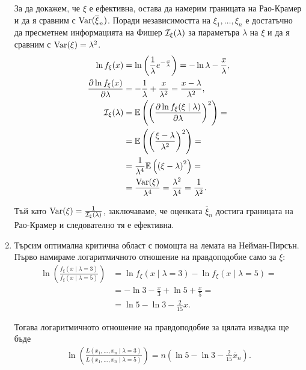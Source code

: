 \documentclass[numbers=endperiod, bibliography=totocnumbered]{scrartcl}
\begin{document}
\begin{solution}
\begin{enumerate}[label=\alph*)]
    За да докажем, че \( \xi \) е ефективна, остава да намерим границата на Рао-Крамер и да я сравним с \( \operatorname{Var}(\overline \xi_n) \). Поради независимостта на \( \xi_1, \ldots, \xi_n \) е достатъчно да пресметнем информацията на Фишер \( \mathcal{I}_\xi(\lambda) \) за параметъра \( \lambda \) на \( \xi \) и да я сравним с \( \operatorname{Var}(\xi) = \lambda^2 \).
    \begin{align*}
      \ln f_\xi(x)
      &=
      \ln \left(\frac 1 \lambda e^{-\frac x \lambda} \right)
      =
      -\ln \lambda -\frac x \lambda,
      \\
      \frac {\partial \ln f_\xi(x)} {\partial \lambda}
      &=
      -\frac 1 \lambda + \frac x {\lambda^2}
      =
      \frac {x - \lambda} {\lambda^2},
      \\
      \mathcal{I}_\xi(\lambda)
      &=
      \mathbb{E} \left( {\left( \frac {\partial \ln f_\xi(\xi \mid \lambda)} {\partial \lambda} \right)}^2 \right)
      = \\ &=
      \mathbb{E} \left( {\left( \frac {\xi - \lambda} {\lambda^2} \right)}^2 \right)
      = \\ &=
      \frac 1 {\lambda^4} \mathbb{E} \left( {({\xi - \lambda})}^2 \right)
      = \\ &=
      \frac {\operatorname{Var}(\xi)} {\lambda^4}
      =
      \frac {\lambda^2} {\lambda^4}
      =
      \frac 1 {\lambda^2}.
    \end{align*}

    Тъй като \( \operatorname{Var}(\xi) = \frac 1 {\mathcal{I}_\xi(\lambda)} \), заключаваме, че оценката \( \overline \xi_n \) достига границата на Рао-Крамер и следователно тя е ефективна.

    \item Търсим оптимална критична област с помощта на лемата на Нейман-Пирсън. Първо намираме логаритмичното отношение на правдоподобие само за \( \xi \):
    \begin{align*}
      \ln \left(\frac {f_\xi(x \mid \lambda=3)} {f_\xi(x \mid \lambda=5)} \right)
      &=
      \ln f_\xi(x \mid \lambda=3) - \ln f_\xi(x \mid \lambda=5)
      = \\ &=
      - \ln 3 - \frac x 3 + \ln 5 + \frac x 5
      = \\ &=
      \ln 5 - \ln 3 - \frac 2 {15} x.
    \end{align*}

    Тогава логаритмичното отношение на правдоподобие за цялата извадка ще бъде
    \begin{align*}
      \ln \left(\frac {L(x_1, \ldots, x_n \mid \lambda=3)} {L(x_1, \ldots, x_n \mid \lambda=5)} \right)
      =
      n \left(\ln 5 - \ln 3 - \frac 2 {15} \overline x_n \right).
    \end{align*}


\end{enumerate}
\end{solution}
\end{document}
